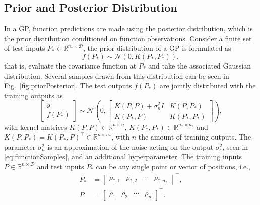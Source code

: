 \documentclass[letterpaper, 10 pt, conference]{ieeeconf}  %
\begin{document}
\subsection{Prior and Posterior Distribution}
In a GP, function predictions are made using the posterior distribution, which is the prior distribution conditioned on function observations. Consider a finite set of test inputs $P_* \in \mathbb{R}^{n_*\times \mathcal{D}}$, the prior distribution of a GP is formulated as
\begin{equation}
	f\left(P_*\right) \sim \mathcal{N}\left(0, K\left(P_*, P_*\right)\right),
\end{equation}
that is, evaluate the covariance function at $P_*$ and take the associated Gaussian distribution. Several samples drawn from this distribution can be seen in Fig.~\ref{fig:priorPosterior}. The test outputs $f\left(P_*\right)$ are jointly distributed with the training outputs as
\begin{equation}
	\label{eq:postDistr}
	\left[\begin{array}{c}
		y \\
		\!\!f\left(P_*\right)\!\!
	\end{array}\right] \sim \mathcal{N}\left(0,\left[\begin{array}{cc}
		\! K(P, P)+\sigma_{n}^{2}I\!\!\!     & K\left(P, P_*\right)\!\! \\
		K\left(P_*, P\right)\!                        & K\left(P_*, P_*\right)\!\!
	\end{array}\right]\right),
\end{equation}
with kernel matrices $K(P,P)\in\mathbb{R}^{n\times n}$, $K(P_*,P_*)\in\mathbb{R}^{n_*\times n_*}$ and $K(P,P_*)=K(P_*,P)^\top \in \mathbb{R}^{n\times n_*}$, with $n$ the amount of training outputs. The parameter $\sigma_n^2$ is an approximation of the noise acting on the output $\sigma_\epsilon^2$, seen in \eqref{eq:functionSamples}, and an additional hyperparameter. The training inputs $P \in \mathbb{R}^{n\times \mathcal{D}}$ and test inputs $P_*$ can be any single point or vector of positions, i.e.,
\begin{equation}
	\label{eq:GPinputs}
	\begin{split}
		P_* &= \begin{bmatrix} \rho_{*,1} & \rho_{*,2} & \cdots & \rho_{*,n_*}
		\end{bmatrix}^\top,\\
		P&=\begin{bmatrix}
			\rho_{1} & \rho_{2} & \cdots & \rho_{n}
		\end{bmatrix}^{\top}.
	\end{split}
\end{equation}
\end{document}
